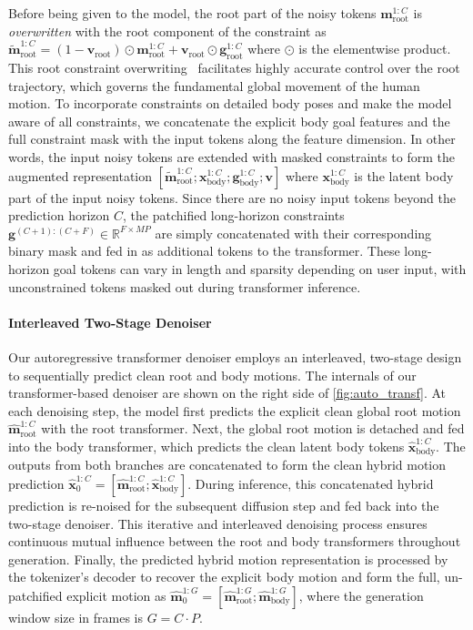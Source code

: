 Before being given to the model, the root part of the noisy tokens $\mathbf{m}^{1:C}_\text{root}$ is \textit{overwritten} with the root component of the constraint as $\tilde{\mathbf{m}}^{1:C}_\text{root} = (1-\mathbf{v}_\text{root}) \odot \mathbf{m}^{1:C}_\text{root} + \mathbf{v}_\text{root} \odot \mathbf{g}^{1:C}_\text{root}$ where $\odot$ is the elementwise product.
This root constraint overwriting~\cite{cohan2024condmdi, Kimodo2026} facilitates highly accurate control over the root trajectory, which governs the fundamental global movement of the human motion.
To incorporate constraints on detailed body poses and make the model aware of all constraints, we concatenate the explicit body goal features and the full constraint mask with the input tokens along the feature dimension.
In other words, the input noisy tokens are extended with masked constraints to form the augmented representation $[\tilde{\mathbf{m}}^{1:C}_\text{root}; \mathbf{x}^{1:C}_\text{body}; \mathbf{g}^{1:C}_\text{body}; \mathbf{v}]$ where $\mathbf{x}^{1:C}_\text{body}$ is the latent body part of the input noisy tokens.
Since there are no noisy input tokens beyond the prediction horizon $C$, the patchified long-horizon constraints $\mathbf{g}^{(C+1):(C+F)} \in \mathbb{R}^{F \times MP}$ are simply concatenated with their corresponding binary mask and fed in as additional tokens to the transformer. 
These long-horizon goal tokens can vary in length and sparsity depending on user input, with unconstrained tokens masked out during transformer inference.



\paragraph{Interleaved Two-Stage Denoiser}
Our autoregressive transformer denoiser employs an interleaved, two-stage design \cite{Kimodo2026} to sequentially predict clean root and body motions.
The internals of our transformer-based denoiser are shown on the right side of \cref{fig:auto_transf}.
At each denoising step, the model first predicts the explicit clean global root motion $\hat{\mathbf{m}}^{1:C}_{\text{root}}$ with the root transformer.
Next, the global root motion is detached and fed into the body transformer, which predicts the clean latent body tokens $\hat{\mathbf{x}}^{1:C}_{\text{body}}$. 
The outputs from both branches are concatenated to form the clean hybrid motion prediction $\hat{\mathbf{x}}^{1:C}_0 = [\hat{\mathbf{m}}^{1:C}_{\text{root}}; \hat{\mathbf{x}}^{1:C}_{\text{body}}]$. 
During inference, this concatenated hybrid prediction is re-noised for the subsequent diffusion step and fed back into the two-stage denoiser. This iterative and interleaved denoising process ensures continuous mutual influence between the root and body transformers throughout generation.
Finally, the predicted hybrid motion representation is processed by the tokenizer's decoder to recover the explicit body motion and form the full, un-patchified explicit motion as $\hat{\mathbf{m}}_0^{1:G} = [\hat{\mathbf{m}}^{1:G}_{\text{root}}; \hat{\mathbf{m}}^{1:G}_{\text{body}}]$, where the generation window size in frames is $G = C \cdot P$.

